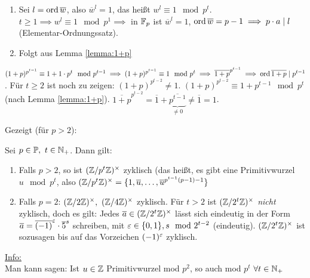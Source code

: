 \documentclass[a4paper,DIV15,BCOR12mm]{article}
\begin{document}
\begin{beweis}
\begin{enumerate}
    \item Sei $l=\mathop{\rm ord}\nolimits \overline w$, also $\overline w^l=1$, das
    heißt $w^l\equiv 1 \mod p^t$. $t\geq 1 \implies w^l \equiv 1
    \mod p^1 \implies $ in $\mathbb{F}_p$ ist $\overline w^l=1$, $\mathop{\rm ord}\nolimits
    \overline w=p-1 \implies p\cdot a \mid l$ (Elementar-Ordnungssatz).
    \item Folgt aus Lemma \ref{lemma:1+p}
\end{enumerate}

$(1+p)^{p^{t-1}}\equiv1+1\cdot p^t \mod p^{t-1} \implies
(1+p)^{p^{t-1}}\equiv 1 \mod p^t \implies \overline{1+p}^{p^{t-1}}
\implies \mathop{\rm ord}\nolimits \overline{1+p} \mid p^{t-1}$. Für $t \geq 2$ ist noch
zu zeigen: $(1+p)^{p^{t-2}} \neq 1$. $(1+p)^{p^{t-2}} \equiv 1+
p^{t-1} \mod p^t$ (nach Lemma \ref{lemma:1+p}).
$\overline{1+p}^{p^{t-2}}=\overline 1 +
\underbrace{\overline{p^{t-1}}}_{\neq 0} \neq \overline 1 =1$.
\end{beweis}

Gezeigt (für $p>2$):
\begin{satz}
Sei $p\in\mathbb{P},\ t\in \mathbb{N}_+$. Dann gilt:
\begin{enumerate}
    \item Falls $p>2$, so ist $(\mathbb{Z}/p^t \mathbb{Z})^{\times}$ zyklisch
    (das heißt, es gibt eine Primitivwurzel $u \mod p^t$, also $(\mathbb{Z}/p^t
    \mathbb{Z})^{\times}=\{ 1,\overline u,\dotsc, \overline
    u^{p^{t-1}(p-1)-1}\}$
    \item Falls $p=2$: $(\mathbb{Z}/2 \mathbb{Z})^{\times},\ (\mathbb{Z}/4
    \mathbb{Z})^{\times}$ zyklisch. Für $t>2$ ist $(\mathbb{Z}/2^t
    \mathbb{Z})^{\times}$ \emph{nicht} zyklisch, doch es gilt: Jedes
    $\overline a \in (\mathbb{Z}/2^t \mathbb{Z})^{\times}$ lässt sich eindeutig
    in der Form $\overline a=\overline{(-1)}^{\varepsilon} \cdot \overline 5
    ^s$ schreiben, mit $\varepsilon \in \{0,1\}, s \mod 2^{t-2}$
    (eindeutig). $(\mathbb{Z}/2^t \mathbb{Z})^{\times}$ ist sozusagen bis auf
    das Vorzeichen $(-1)^{\varepsilon}$ zyklisch.
\end{enumerate}
\end{satz}


\underline{Info:}\\
Man kann sagen: Ist $u \in \mathbb{Z}$  Primitivwurzel mod $p^2$, so auch mod $p^t$ $\forall t \in \mathbb{N}_+$
\\
\end{document}
